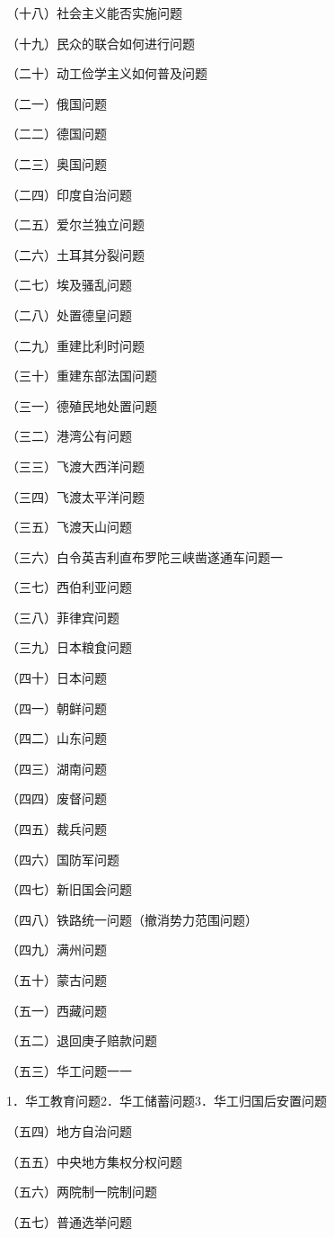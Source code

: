 （十八）社会主义能否实施问题

（十九）民众的联合如何进行问题

（二十）动工俭学主义如何普及问题

（二一）俄国问题

（二二）德国问题

（二三）奥国问题

（二四）印度自治问题

（二五）爱尔兰独立问题

（二六）土耳其分裂问题

（二七）埃及骚乱问题

（二八）处置德皇问题

（二九）重建比利时问题

（三十）重建东部法国问题

（三一）德殖民地处置问题

（三二）港湾公有问题

（三三）飞渡大西洋问题

（三四）飞渡太平洋问题

（三五）飞渡天山问题

（三六）白令英吉利直布罗陀三峡凿遂通车问题一

（三七）西伯利亚问题

（三八）菲律宾问题

（三九）日本粮食问题

（四十）日本问题

（四一）朝鲜问题

（四二）山东问题

（四三）湖南问题

（四四）废督问题

（四五）裁兵问题

（四六）国防军问题

（四七）新旧国会问题

（四八）铁路统一问题（撤消势力范围问题）

（四九）满州问题

（五十）蒙古问题

（五一）西藏问题

（五二）退回庚子赔款问题

（五三）华工问题一一

1．华工教育问题2．华工储蓄问题3．华工归国后安置问题

（五四）地方自治问题

（五五）中央地方集权分权问题

（五六）两院制一院制问题

（五七）普通选举问题

